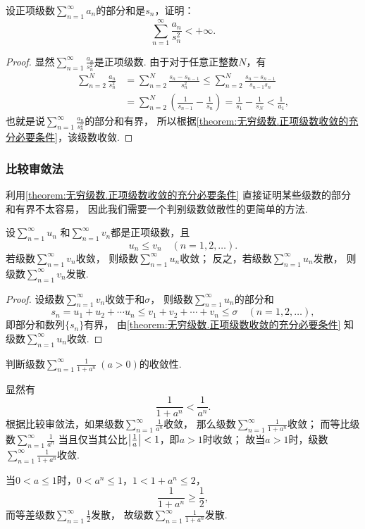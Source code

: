 \begin{example}
设正项级数\(\sum_{n=1}^\infty a_n\)的部分和是\(s_n\)，证明：\[
	\sum_{n=1}^\infty \frac{a_n}{s_n^2} < +\infty.
\]
\begin{proof}
显然\(\sum_{n=1}^\infty \frac{a_n}{s_n^2}\)是正项级数.
由于对于任意正整数\(N\)，有\begin{align*}
	\sum_{n=2}^N \frac{a_n}{s_n^2}
	&= \sum_{n=2}^N \frac{s_n-s_{n-1}}{s_n^2}
	\leq \sum_{n=2}^N \frac{s_n-s_{n-1}}{s_{n-1} s_n} \\
	&= \sum_{n=2}^N \left(
			\frac{1}{s_{n-1}} - \frac{1}{s_n}
		\right)
	= \frac{1}{s_1} - \frac{1}{s_N}
	< \frac{1}{a_1},
\end{align*}
也就是说\(\sum_{n=1}^\infty \frac{a_n}{s_n^2}\)的部分和有界，
所以根据\cref{theorem:无穷级数.正项级数收敛的充分必要条件}，该级数收敛.
\end{proof}
\end{example}

\subsubsection{比较审敛法}
利用\cref{theorem:无穷级数.正项级数收敛的充分必要条件} 直接证明某些级数的部分和有界不太容易，
因此我们需要一个判别级数敛散性的更简单的方法.

\begin{theorem}[比较审敛法]\label{theorem:无穷级数.正项级数的比较审敛法}
设\(\sum_{n=1}^\infty u_n\)
和\(\sum_{n=1}^\infty v_n\)都是正项级数，且\[
	u_n \leq v_n
	\quad(n=1,2,\dotsc).
\]
若级数\(\sum_{n=1}^\infty v_n\)收敛，
则级数\(\sum_{n=1}^\infty u_n\)收敛；
反之，若级数\(\sum_{n=1}^\infty u_n\)发散，
则级数\(\sum_{n=1}^\infty v_n\)发散.
\begin{proof}
设级数\(\sum_{n=1}^\infty v_n\)收敛于和\(\sigma\)，
则级数\(\sum_{n=1}^\infty u_n\)的部分和\[
	s_n = u_1 + u_2 + \dotsb u_n
	\leq
	v_1 + v_2 + \dotsb + v_n \leq \sigma
	\quad(n=1,2,\dotsc),
\]
即部分和数列\(\{s_n\}\)有界，
由\cref{theorem:无穷级数.正项级数收敛的充分必要条件} 知级数\(\sum_{n=1}^\infty u_n\)收敛.
\end{proof}
\end{theorem}

\begin{example}
判断级数\(\sum_{n=1}^\infty \frac{1}{1+a^n}\ (a>0)\)的收敛性.
\begin{solution}
显然有\[
	\frac{1}{1+a^n} < \frac{1}{a^n}.
\]
根据比较审敛法，如果级数\(\sum_{n=1}^\infty \frac{1}{a^n}\)收敛，
那么级数\(\sum_{n=1}^\infty \frac{1}{1+a^n}\)收敛；
而等比级数\(\sum_{n=1}^\infty \frac{1}{a^n}\)
当且仅当其公比\(\abs{\frac{1}{a}} < 1\)，即\(a > 1\)时收敛；
故当\(a > 1\)时，级数\(\sum_{n=1}^\infty \frac{1}{1+a^n}\)收敛.

当\(0 < a \leq 1\)时，\(0 < a^n \leq 1\)，\(1 < 1 + a^n \leq 2\)，\[
	\frac{1}{1+a^n} \geq \frac{1}{2},
\]
而等差级数\(\sum_{n=1}^\infty \frac{1}{2}\)发散，
故级数\(\sum_{n=1}^\infty \frac{1}{1+a^n}\)发散.
\end{solution}
\end{example}

